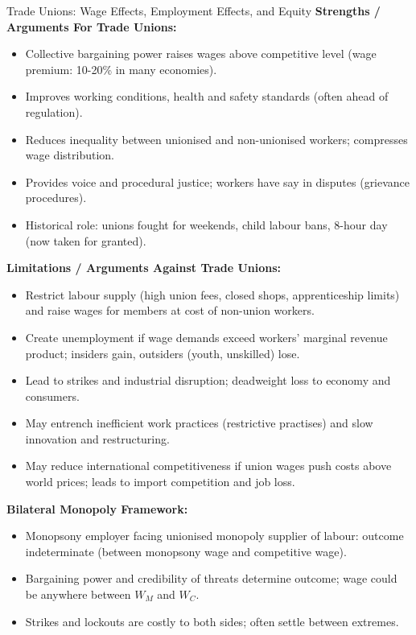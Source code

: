 \documentclass[11pt, a4paper, twoside]{book}
\begin{document}
\begin{evaluation}{Trade Unions: Wage Effects, Employment Effects, and Equity}
\textbf{Strengths / Arguments For Trade Unions:}
\begin{itemize}[leftmargin=*, nosep]
\item Collective bargaining power raises wages above competitive level (wage premium: 10-20\% in many economies).
\item Improves working conditions, health and safety standards (often ahead of regulation).
\item Reduces inequality between unionised and non-unionised workers; compresses wage distribution.
\item Provides voice and procedural justice; workers have say in disputes (grievance procedures).
\item Historical role: unions fought for weekends, child labour bans, 8-hour day (now taken for granted).
\end{itemize}
\textbf{Limitations / Arguments Against Trade Unions:}
\begin{itemize}[leftmargin=*, nosep]
\item Restrict labour supply (high union fees, closed shops, apprenticeship limits) and raise wages for members at cost of non-union workers.
\item Create unemployment if wage demands exceed workers' marginal revenue product; insiders gain, outsiders (youth, unskilled) lose.
\item Lead to strikes and industrial disruption; deadweight loss to economy and consumers.
\item May entrench inefficient work practices (restrictive practises) and slow innovation and restructuring.
\item May reduce international competitiveness if union wages push costs above world prices; leads to import competition and job loss.
\end{itemize}
\textbf{Bilateral Monopoly Framework:}
\begin{itemize}[leftmargin=*, nosep]
\item Monopsony employer facing unionised monopoly supplier of labour: outcome indeterminate (between monopsony wage and competitive wage).
\item Bargaining power and credibility of threats determine outcome; wage could be anywhere between $W_M$ and $W_C$.
\item Strikes and lockouts are costly to both sides; often settle between extremes.
\end{itemize}

\end{evaluation}
\end{document}
